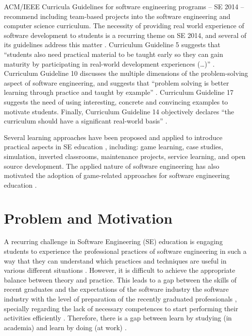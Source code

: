 ACM/IEEE Curricula Guidelines for software engineering programs – SE 2014 \citep{Acm:2015} – recommend including team-based projects into the software engineering and computer science curriculum. The necessity of providing real world experience of software development to students is a recurring theme on SE 2014, and several of its guidelines address this matter \citep{Acm:2015}. Curriculum Guideline 5 suggests that “students also need practical material to be taught early so they can gain maturity by participating in real-world development experiences (…)” \citep{Acm:2015}. Curriculum Guideline 10 discusses the multiple dimensions of the problem-solving aspect of software engineering, and suggests that “problem solving is better learning through practice and taught by example” \citep{Acm:2015}. Curriculum Guideline 17 suggests the need of using interesting, concrete and convincing examples to motivate students. Finally, Curriculum Guideline 14 objectively declares “the curriculum should have a significant real-world basis” \citep{Acm:2015}.

Several learning approaches have been proposed and applied to introduce practical aspects in SE education \citep{Marques:2014}, including: game learning, case studies, simulation, inverted classrooms, maintenance projects, service learning, and open source development. The applied nature of software engineering  has also motivated the adoption of game-related approaches for software engineering education \citep{Souza:2018}.

\section{Problem and Motivation}
\label{sec:problem}

A recurring challenge in Software Engineering (SE) education is engaging students to experience the professional practices of software engineering in such a way that they can understand which practices and techniques are useful in various different situations \citep{Acm:2015}. However, it is difficult to achieve the appropriate balance between theory and practice. This leads to a gap between the skills of recent graduates and the expectations of the software industry the software industry with the level of preparation of the recently graduated professionals \citep{Radermacher:2014}, specially regarding the lack of necessary competences to start performing their activities efficiently \citep{vonWangenheim:2009, Moreno:2012, Meira:2015}. Therefore, there is a gap between learn by studying (in academia) and learn by doing (at work) \citep{Moreno:2012}.

